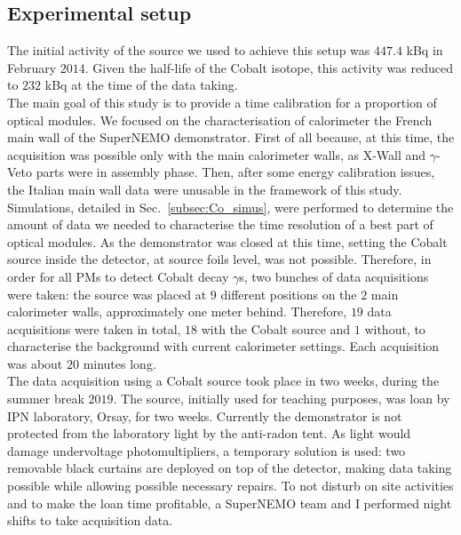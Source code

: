 
\subsection{Experimental setup}

The initial activity of the source we used to achieve this setup was $447.4$ kBq in February $2014$.
Given the half-life of the Cobalt isotope, this activity was reduced to $232$ kBq at the time of the data taking.\\
\newline
The main goal of this study is to provide a time calibration for a proportion of optical modules.
We focused on the characterisation of calorimeter the French main wall of the SuperNEMO demonstrator.
First of all because, at this time, the acquisition was possible only with the main calorimeter walls, as X-Wall and $\gamma$-Veto parts were in assembly phase.
Then, after some energy calibration issues, the Italian main wall data were unusable in the framework of this study.\\
\newline
Simulations, detailed in Sec.~\ref{subsec:Co_simus}, were performed to determine the amount of data we needed to characterise the time resolution of a best part of optical modules.
As the demonstrator was closed at this time, setting the Cobalt source inside the detector, at source foils level, was not possible.
Therefore, in order for all PMs to detect Cobalt decay $\gamma$s, two bunches of data acquisitions were taken:
the source was placed at $9$ different positions on the $2$ main calorimeter walls, approximately one meter behind.
Therefore, $19$ data acquisitions were taken in total, $18$ with the Cobalt source and $1$ without, to characterise the background with current calorimeter settings.
Each acquisition was about $20$ minutes long.\\
\newline
The data acquisition using a Cobalt source took place in two weeks, during the summer break $2019$.
The source, initially used for teaching purposes, was loan by IPN laboratory, Orsay, for two weeks.
Currently the demonstrator is not protected from the laboratory light by the anti-radon tent.
As light would damage undervoltage photomultipliers, a temporary solution is used: two removable black curtains are deployed on top of the detector, making data taking possible while allowing possible necessary repairs.
To not disturb on site activities and to make the loan time profitable, a SuperNEMO team and I performed night shifts to take acquisition data.

